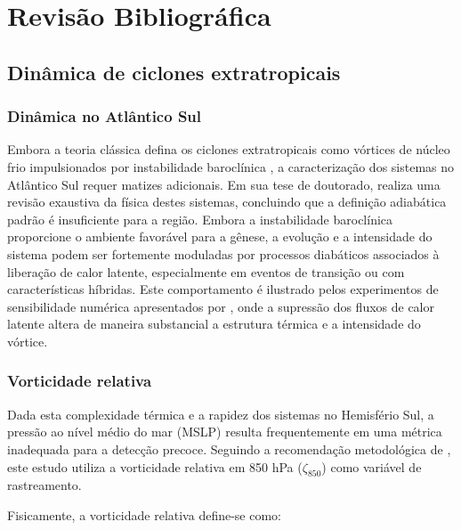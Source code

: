 \chapter{Revisão Bibliográfica}\label{cap:revbibliografica}
\section{Dinâmica de ciclones extratropicais}\label{sec:mt_fundamentos}

\subsection{Dinâmica no Atlântico Sul}\label{subsec:mt_definicion}
Embora a teoria clássica defina os ciclones extratropicais como vórtices de núcleo frio impulsionados por instabilidade baroclínica \citep{hoskins2002new}, a caracterização dos sistemas no Atlântico Sul requer matizes adicionais. Em sua tese de doutorado, \citet{coutodesouza2024thesis} realiza uma revisão exaustiva da física destes sistemas, concluindo que a definição adiabática padrão é insuficiente para a região. Embora a instabilidade baroclínica proporcione o ambiente favorável para a gênese, a evolução e a intensidade do sistema podem ser fortemente moduladas por processos diabáticos associados à liberação de calor latente, especialmente em eventos de transição ou com características híbridas. Este comportamento é ilustrado pelos experimentos de sensibilidade numérica apresentados por \citet{reboita2022from}, onde a supressão dos fluxos de calor latente altera de maneira substancial a estrutura térmica e a intensidade do vórtice.

\subsection{Vorticidade relativa}\label{subsec:mt_vorticidad}
Dada esta complexidade térmica e a rapidez dos sistemas no Hemisfério Sul, a pressão ao nível médio do mar (MSLP) resulta frequentemente em uma métrica inadequada para a detecção precoce. Seguindo a recomendação metodológica de \citet{sinclair1997objective}, este estudo utiliza a vorticidade relativa em 850 hPa ($\zeta_{850}$) como variável de rastreamento.

Fisicamente, a vorticidade relativa define-se como:

